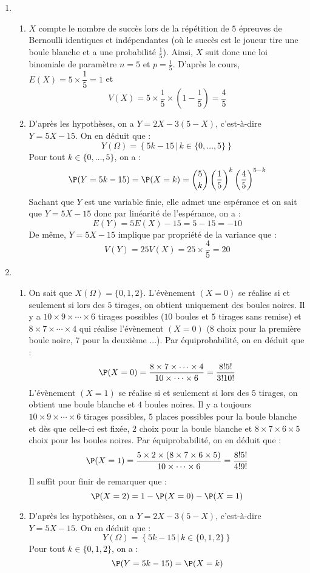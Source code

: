 \documentclass[a4paper,10pt]{report}
\begin{document}
\corr \begin{enumerate}
\item
\begin{enumerate}
\item $X$ compte le nombre de succès lors de la répétition de $5$ épreuves de Bernoulli identiques et indépendantes (où le succès est \og le joueur tire une boule blanche \fg et a une probabilité $\tfrac{1}{5}$). Ainsi, $X$ suit donc une loi binomiale de paramètre $n=5$ et $p=\tfrac{1}{5}$. D'après le cours, $E(X)=5\times\dfrac{1}{5}=1$ et 
$$V(X)=5\times\dfrac{1}{5}\times\left( 1-\dfrac{1}{5}\right)=\dfrac{4}{5}$$
 \item
  D'après les hypothèses, on a $Y=2X-3(5-X)$, c'est-à-dire $Y=5X-15$. On en déduit que :
  $$Y(\Omega)=\left\lbrace 5k-15 \, \vert \, k\in \lbrace 0, \ldots, 5\rbrace \right\rbrace $$
Pour tout $k \in  \lbrace 0, \ldots, 5\rbrace$, on a :
$$\P(Y=5k-15)= \P(X=k)=\binom{5}{k} \left(\dfrac{1}{5} \right)^k \left(\dfrac{4}{5}\right)^{5-k}$$
Sachant que $Y$ est une variable finie, elle admet une espérance et on sait que $Y=5X-15$ donc par linéarité de l'espérance, on a : 
$$E(Y)=5E(X)-15=5-15=-10$$
De même, $Y=5X-15$ implique par propriété de la variance que :
$$V(Y)=25V(X)=25\times\dfrac{4}{5}=20$$
\end{enumerate}
\item 
\begin{enumerate}
\item On sait que $X(\Omega) = \lbrace 0,1,2 \rbrace$. L'évènement $(X=0)$ se réalise si et seulement si lors des $5$ tirages, on obtient uniquement des boules noires. Il y a $10\times 9 \times \cdots \times 6$ tirages possibles ($10$ boules et $5$ tirages sans remise) et $8 \times 7 \times \cdots \times 4$ qui réalise l'évènement $(X=0)$ ($8$ choix pour la première boule noire, $7$ pour la deuxième ...). Par équiprobabilité, on en déduit que :
$$ \P(X=0) = \dfrac{8 \times 7 \times \cdots \times 4}{10 \times \cdots \times 6} = \dfrac{8! 5!}{3!10!}$$
L'évènement $(X=1)$ se réalise si et seulement si lors des $5$ tirages, on obtient une boule blanche et $4$ boules noires. Il y a toujours $10\times 9 \times \cdots \times 6$ tirages possibles, $5$ places possibles pour la boule blanche et dès que celle-ci est fixée, $2$ choix pour la boule blanche et $8 \times 7 \times 6 \times 5$ choix pour les boules noires. Par équiprobabilité, on en déduit que :
$$ \P(X=1) = \dfrac{5 \times 2 \times (8 \times 7 \times 6 \times 5)}{10 \times \cdots \times 6} = \dfrac{8!5!}{4!9!}$$
Il suffit pour finir de remarquer que :
$$ \P(X=2)= 1- \P(X=0)-\P(X=1)$$
\item  D'après les hypothèses, on a $Y=2X-3(5-X)$, c'est-à-dire $Y=5X-15$. On en déduit que :
  $$Y(\Omega)=\left\lbrace 5k-15 \, \vert \, k\in \lbrace 0, 1, 2\rbrace \right\rbrace $$
Pour tout $k \in  \lbrace 0, 1, 2\rbrace$, on a :
$$\P(Y=5k-15)= \P(X=k)$$


\end{enumerate}
\end{enumerate}
\end{document}
